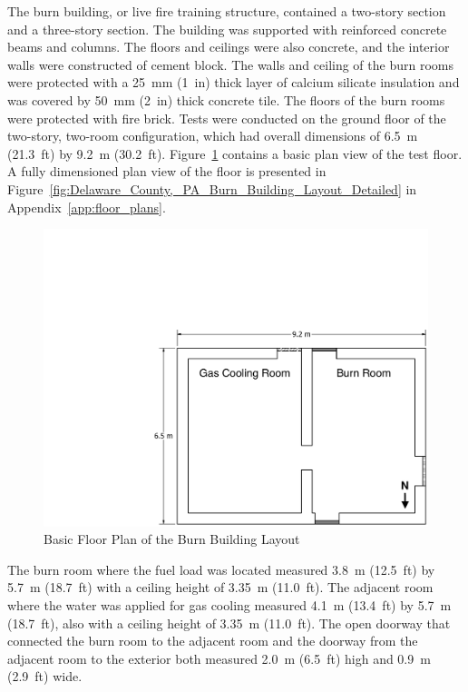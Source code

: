 \documentclass[12pt,oneside]{book}
\begin{document}
The burn building, or live fire training structure, contained a two-story section and a three-story section. The building was supported with reinforced concrete beams and columns. The floors and ceilings were also concrete, and the interior walls were constructed of cement block. The walls and ceiling of the burn rooms were protected with a 25~mm (1~in) thick layer of calcium silicate insulation and was covered by 50~mm (2~in) thick concrete tile. The floors of the burn rooms were protected with fire brick. Tests were conducted on the ground floor of the two-story, two-room configuration, which had overall dimensions of 6.5~m (21.3~ft) by 9.2~m (30.2~ft). Figure~\ref{fig:Delaware_County,_PA_Burn_Building_Layout} contains a basic plan view of the test floor. A fully dimensioned plan view of the floor is presented in Figure~\ref{fig:Delaware_County,_PA_Burn_Building_Layout_Detailed} in Appendix~\ref{app:floor_plans}.

\begin{figure}[!ht]
	\includegraphics[width=\columnwidth]{../Figures/Floor_Plans/PDFs/West_Structure/DelCo_2012_West_Structure_Plain}
	\caption{Basic Floor Plan of the Burn Building Layout}
	\label{fig:Delaware_County,_PA_Burn_Building_Layout}
\end{figure}

The burn room where the fuel load was located measured 3.8~m (12.5~ft) by 5.7~m (18.7~ft) with a ceiling height of 3.35~m (11.0~ft). The adjacent room where the water was applied for gas cooling measured 4.1~m (13.4~ft) by 5.7~m (18.7~ft), also with a ceiling height of 3.35~m (11.0~ft). The open doorway that connected the burn room to the adjacent room and the doorway from the adjacent room to the exterior both measured 2.0~m (6.5~ft) high and 0.9~m (2.9~ft) wide.
\end{document}
